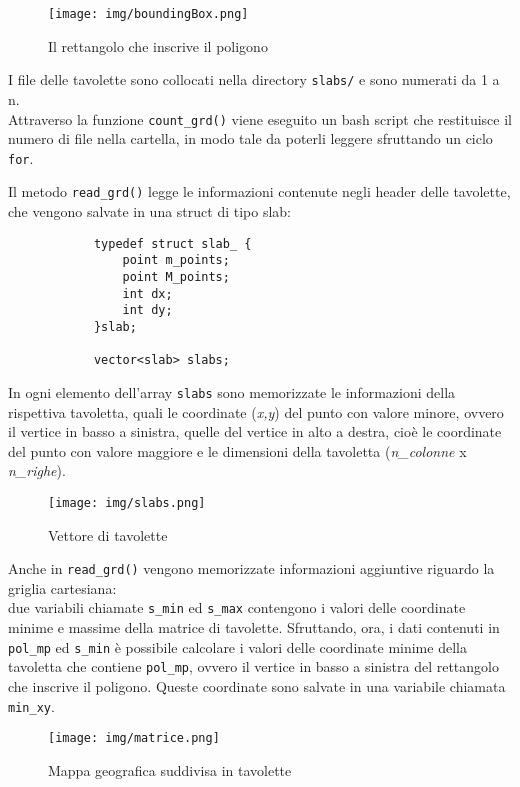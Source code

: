 		\begin{figure}[htbp]
			\centering
			\texttt{[image: img/boundingBox.png]}
			\caption{Il rettangolo che inscrive il poligono}
		\end{figure}

		I file delle tavolette sono collocati nella directory \texttt{slabs/} e sono numerati da 1 a n. \\
		Attraverso la funzione \texttt{count\_grd()} viene eseguito un bash script che restituisce il numero di file nella cartella, in modo tale da poterli leggere sfruttando un ciclo \texttt{for}.

		Il metodo \texttt{read\_grd()} legge le informazioni contenute negli header delle tavolette, che vengono salvate in una struct di tipo slab:
		\begin{verbatim}
			typedef struct slab_ {
			    point m_points;
			    point M_points;
			    int dx;
			    int dy;
			}slab;

			vector<slab> slabs;
		\end{verbatim}
		In ogni elemento dell'array \texttt{slabs} sono memorizzate le informazioni della rispettiva tavoletta, quali le coordinate (\textit{x,y}) del punto con valore minore, ovvero il vertice in basso a sinistra, quelle del vertice in alto a destra, cio\`{e} le coordinate del punto con valore maggiore e le dimensioni della tavoletta (\textit{n\_colonne} x \textit{n\_righe}).

		\begin{figure}[htbp]
			\centering
			\texttt{[image: img/slabs.png]}
			\caption{Vettore di tavolette}
		\end{figure}

		Anche in \texttt{read\_grd()} vengono memorizzate informazioni aggiuntive riguardo la griglia cartesiana:\\
		due variabili chiamate \texttt{s\_min} ed \texttt{s\_max} contengono i valori delle coordinate minime e massime della matrice di tavolette. Sfruttando, ora, i dati contenuti in \texttt{pol\_mp} ed \texttt{s\_min} \`{e} possibile calcolare i valori delle coordinate minime della tavoletta che contiene \texttt{pol\_mp}, ovvero il vertice in basso a sinistra del rettangolo che inscrive il poligono. Queste coordinate sono salvate in una variabile chiamata \texttt{min\_xy}.
		\newpage
		\begin{figure}[t]
			\centering
			\texttt{[image: img/matrice.png]}
			\caption{Mappa geografica suddivisa in tavolette}
		\end{figure}  

